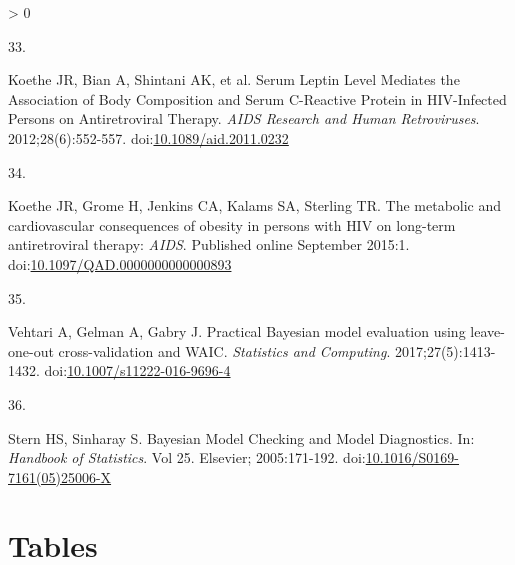 \documentclass[
]{article}
\newlength{\cslhangindent}
\newlength{\csllabelwidth}
\newenvironment{CSLReferences}[2] %
 {%
  \setlength{\parindent}{0pt}
  \ifodd #1 \everypar{\setlength{\hangindent}{\cslhangindent}}\ignorespaces\fi
  \ifnum #2 > 0
  \setlength{\parskip}{#2\baselineskip}
  \fi
 }%
 {}
\newcommand{\CSLLeftMargin}[1]{\parbox[t]{\csllabelwidth}{#1}}
\newcommand{\CSLRightInline}[1]{\parbox[t]{\linewidth - \csllabelwidth}{#1}\break}
\begin{document}
\begin{CSLReferences}{0}{0}
\leavevmode\hypertarget{ref-koethe_serum_2012}{}%
\CSLLeftMargin{33. }
\CSLRightInline{Koethe JR, Bian A, Shintani AK, et al. Serum {Leptin} {Level} {Mediates} the {Association} of {Body} {Composition} and {Serum} {C}-{Reactive} {Protein} in {HIV}-{Infected} {Persons} on {Antiretroviral} {Therapy}. \emph{AIDS Research and Human Retroviruses}. 2012;28(6):552-557. doi:\href{https://doi.org/10.1089/aid.2011.0232}{10.1089/aid.2011.0232}}

\leavevmode\hypertarget{ref-koethe_metabolic_2015}{}%
\CSLLeftMargin{34. }
\CSLRightInline{Koethe JR, Grome H, Jenkins CA, Kalams SA, Sterling TR. The metabolic and cardiovascular consequences of obesity in persons with {HIV} on long-term antiretroviral therapy: \emph{AIDS}. Published online September 2015:1. doi:\href{https://doi.org/10.1097/QAD.0000000000000893}{10.1097/QAD.0000000000000893}}

\leavevmode\hypertarget{ref-vehtari_practical_2017}{}%
\CSLLeftMargin{35. }
\CSLRightInline{Vehtari A, Gelman A, Gabry J. Practical {Bayesian} model evaluation using leave-one-out cross-validation and {WAIC}. \emph{Statistics and Computing}. 2017;27(5):1413-1432. doi:\href{https://doi.org/10.1007/s11222-016-9696-4}{10.1007/s11222-016-9696-4}}

\leavevmode\hypertarget{ref-stern_bayesian_2005}{}%
\CSLLeftMargin{36. }
\CSLRightInline{Stern HS, Sinharay S. Bayesian {Model} {Checking} and {Model} {Diagnostics}. In: \emph{Handbook of {Statistics}}. Vol 25. Elsevier; 2005:171-192. doi:\href{https://doi.org/10.1016/S0169-7161(05)25006-X}{10.1016/S0169-7161(05)25006-X}}

\end{CSLReferences}

\break

\hypertarget{tables}{%
\section*{Tables}\label{tables}}
\end{document}
